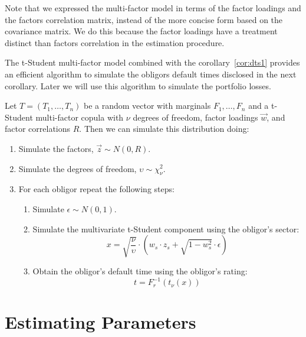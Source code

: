 \documentclass[11pt,fleqn]{book} %
\begin{document}
Note that we expressed the multi-factor model in terms of the factor 
loadings and the factors correlation matrix, instead of the more concise 
form based on the covariance matrix. We do this because the factor loadings 
have a treatment distinct than factors correlation in the estimation procedure.

The t-Student multi-factor model combined with the corollary~\ref{cor:dts1} 
provides an efficient algorithm to simulate the obligors default times 
disclosed in the next corollary. Later we will use this algorithm to simulate
the portfolio losses.

\begin{corollary}
	\label{cor:dts2}
	Let $T=(T_1, \dots, T_n)$ be a random vector with marginals 
	$F_1, \dots, F_n$ and a t-Student multi-factor copula with 
	$\nu$ degrees of freedom, factor loadings $\vec{w}$, and factor correlations 
	$R$. Then we can simulate this distribution doing:
	\begin{enumerate}
		\item Simulate the factors, $\vec{z} \sim N(0,R)$.
		\item Simulate the degrees of freedom, $\upsilon \sim \chi_{\nu}^2$.
		\item For each obligor repeat the following steps:
		\begin{enumerate}
			\item Simulate $\epsilon \sim N(0,1)$.
			\item Simulate the multivariate t-Student component using the obligor's sector:
			\begin{displaymath}
				x = \sqrt{\frac{\nu}{\upsilon}} \cdot \left( w_s \cdot z_s + \sqrt{1-w_s^2} \cdot \epsilon \right)
			\end{displaymath}
			\item Obtain the obligor's default time using the obligor's rating:
			\begin{displaymath}
				t = F_r^{-1}\left(t_{\nu}(x)\right)
			\end{displaymath}
		\end{enumerate}
	\end{enumerate}
\end{corollary}


\chapter{Estimating Parameters}
\label{chap:estimation}
\end{document}
